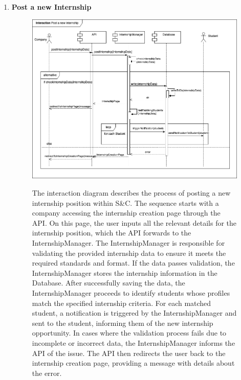\begin{enumerate}
    \newpage
    \item \textbf{Post a new Internship}
    \begin{figure}[h!]
            \centering  \includegraphics[width=1\textwidth]{DD/Images/Interactions/INT09_PostNewInternship.drawio.png}
            \label{fig:ComponentViewDiagram}
            \caption*{The interaction diagram describes the process of posting a new internship position within S\&C. The sequence starts with a company accessing the internship creation page through the API. On this page, the user inputs all the relevant details for the internship position, which the API forwards to the InternshipManager. The InternshipManager is responsible for validating the provided internship data to ensure it meets the required standards and format. If the data passes validation, the InternshipManager stores the internship information in the Database. After successfully saving the data, the InternshipManager proceeds to identify students whose profiles match the specified internship criteria. For each matched student, a notification is triggered by the InternshipManager and sent to the student, informing them of the new internship opportunity. In cases where the validation process fails due to incomplete or incorrect data, the InternshipManager informs the API of the issue. The API then redirects the user back to the internship creation page, providing a message with details about the error.
            }       
    \end{figure}


\end{enumerate}
